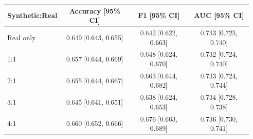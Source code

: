\begin{tabular}{lccc}
\toprule
Synthetic:Real & Accuracy [95\% CI] & F1 [95\% CI] & AUC [95\% CI] \\
\midrule
Real only & 0.649 [0.643, 0.655] & 0.642 [0.622, 0.663] & 0.733 [0.725, 0.740] \\
1:1 & 0.657 [0.644, 0.669] & 0.648 [0.624, 0.670] & 0.732 [0.724, 0.740] \\
2:1 & 0.655 [0.644, 0.667] & 0.663 [0.644, 0.682] & 0.733 [0.724, 0.744] \\
3:1 & 0.645 [0.641, 0.651] & 0.638 [0.624, 0.653] & 0.734 [0.728, 0.738] \\
4:1 & 0.660 [0.652, 0.666] & 0.676 [0.663, 0.689] & 0.736 [0.730, 0.741] \\
\bottomrule
\end{tabular}